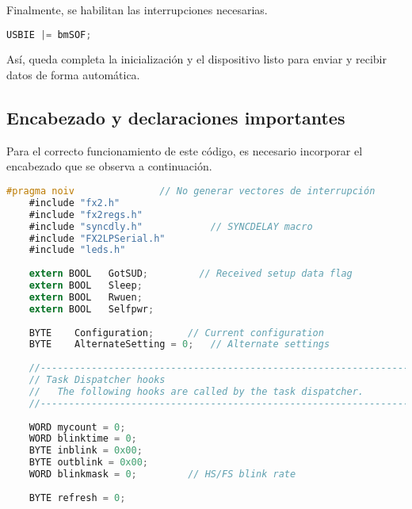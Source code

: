 	Finalmente, se habilitan las interrupciones necesarias.
	
%	
	\begin{lstlisting}[language=C,backgroundcolor=\color{gray!30}]
	USBIE |= bmSOF;
	\end{lstlisting}

	Así, queda completa la inicialización y el dispositivo listo para enviar y recibir datos de forma automática.\\
	
\subsection{Encabezado y declaraciones importantes}
	Para el correcto funcionamiento de este código, es necesario incorporar el encabezado que se observa a continuación.
	
	\begin{lstlisting}[language=C,backgroundcolor=\color{gray!30}]
	#pragma noiv               // No generar vectores de interrupción
	#include "fx2.h"
	#include "fx2regs.h"
	#include "syncdly.h"            // SYNCDELAY macro
	#include "FX2LPSerial.h"
	#include "leds.h"
	
	extern BOOL   GotSUD;         // Received setup data flag
	extern BOOL   Sleep;
	extern BOOL   Rwuen;
	extern BOOL   Selfpwr;
	
	BYTE    Configuration;      // Current configuration
	BYTE    AlternateSetting = 0;   // Alternate settings
	
	//-----------------------------------------------------------------------------
	// Task Dispatcher hooks
	//   The following hooks are called by the task dispatcher.
	//-----------------------------------------------------------------------------
	
	WORD mycount = 0;
	WORD blinktime = 0;
	BYTE inblink = 0x00;
	BYTE outblink = 0x00;
	WORD blinkmask = 0;			// HS/FS blink rate
	
	BYTE refresh = 0;
	\end{lstlisting}
%	

